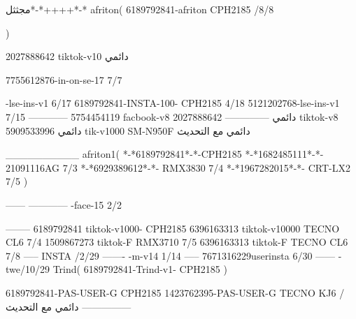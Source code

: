 مجثثل*-*++++*-*
afriton(
6189792841-afriton CPH2185  /8/8

)

2027888642 tiktok-v10
دائمي

7755612876-in-on-se-17 7/7

-lse-ins-v1 6/17
6189792841-INSTA-100- CPH2185 4/18
5121202768-lse-ins-v1 7/15
------------
5754454119 facbook-v8
دائمي
--------------
2027888642 tiktok-v8
دائمي
5909533996 tik-v1000  SM-N950F
دائمي مع التحديث

__________
afriton1(
*-*6189792841*-*-CPH2185
*-*1682485111*-*- 21091116AG  7/3
*-*6929389612*-*-  RMX3830  7/4
*-*1967282015*-*-  CRT-LX2  7/5
)


------
------------
-face-15 2/2

--------
6189792841 tiktok-v1000- CPH2185 
6396163313 tiktok-v10000 TECNO CL6  7/4
1509867273 tiktok-F RMX3710  7/5
6396163313 tiktok-F TECNO CL6  7/8
-----
 INSTA /2/29
-------
-m-v14 1/14
-----
7671316229userinsta 6/30
------
-twe/10/29
Trind(
6189792841-Trind-v1- CPH2185 
)


6189792841-PAS-USER-G CPH2185 
1423762395-PAS-USER-G TECNO KJ6  /دائمي مع التحديث
    ---------------
